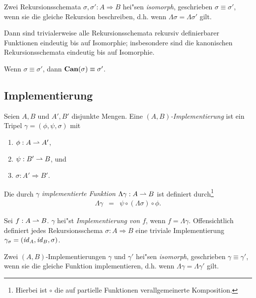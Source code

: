 \documentclass[12pt,a4paper]{article}
\begin{document}
\begin{definition}
  Zwei Rekursionsschemata $\sigma,\sigma':A \Rightarrow B$ hei"sen \emph{isomorph},
  geschrieben $\sigma \equiv \sigma'$, wenn sie die gleiche Rekursion beschreiben,
  d.h. wenn $\Lambda \sigma = \Lambda \sigma'$ gilt.
\end{definition}
Dann sind trivialerweise alle Rekursionsschemata rekursiv definierbarer Funktionen eindeutig
bis auf Isomorphie; insbesondere sind die kanonischen Rekursionsschemata eindeutig bis auf
Isomorphie.

\begin{corollary}
  Wenn $\sigma \equiv \sigma'$, dann $\mathbf{Can}(\sigma) \equiv \sigma'$.
\end{corollary}


\subsection{Implementierung}

\begin{definition}[Implementierung]
  Seien $A,B$ und $A',B'$ disjunkte Mengen. Eine \emph{$(A,B)$-Implementierung} ist ein Tripel
  $\gamma = (\phi,\psi,\sigma)$ mit
  \begin{enumerate}
  \item $\phi:A \rightharpoonup A'$,
  \item $\psi:B' \rightharpoonup B$, und
  \item $\sigma: A' \Rightarrow B'$.
  \end{enumerate}
  Die durch $\gamma$ \emph{implementierte Funktion $\Lambda\gamma: A \rightharpoonup B$} ist definiert
  durch\footnote{Hierbei ist $\circ$ die auf partielle Funktionen verallgemeinerte Komposition.}
  \[\begin{array}{rcl}
    \Lambda \gamma &=& \psi \circ (\Lambda \sigma) \circ \phi.
  \end{array}\]
\end{definition}
Sei $f: A \rightharpoonup B$. $\gamma$ hei"st \emph{Implementierung von $f$}, wenn $f = \Lambda \gamma$.
Offensichtlich definiert jedes Rekursionsschema $\sigma:A \Rightarrow B$ eine triviale
Implementierung $\gamma_\sigma = (\mathit{id}_A,\mathit{id}_B,\sigma)$.

\begin{definition}
  Zwei $(A,B)$-Implementierungen $\gamma$ und $\gamma'$ hei"sen \emph{isomorph}, geschrieben
  $\gamma \equiv \gamma'$, wenn sie die gleiche Funktion implementieren, d.h. wenn
  $\Lambda \gamma = \Lambda \gamma'$ gilt.
\end{definition}
\end{document}
